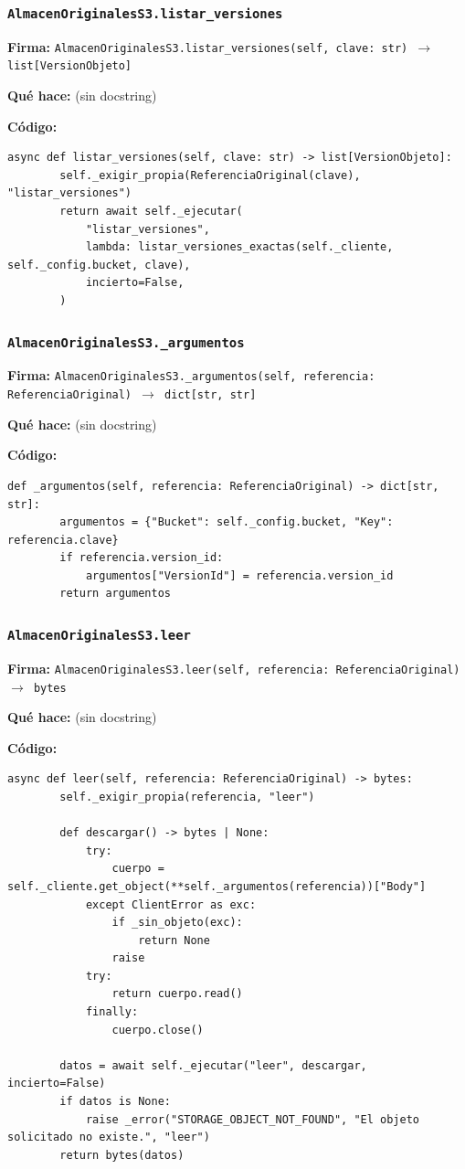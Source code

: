 \documentclass[11pt,a4paper]{article}
\begin{document}
\subsubsection*{\texttt{AlmacenOriginalesS3.listar\_versiones}}
\textbf{Firma:} \texttt{AlmacenOriginalesS3.listar\_versiones(self, clave: str) $\rightarrow$ list[VersionObjeto]}

\textbf{Qué hace:} (sin docstring)

\textbf{Código:}
\begin{lstlisting}
async def listar_versiones(self, clave: str) -> list[VersionObjeto]:
        self._exigir_propia(ReferenciaOriginal(clave), "listar_versiones")
        return await self._ejecutar(
            "listar_versiones",
            lambda: listar_versiones_exactas(self._cliente, self._config.bucket, clave),
            incierto=False,
        )
\end{lstlisting}

\subsubsection*{\texttt{AlmacenOriginalesS3.\_argumentos}}
\textbf{Firma:} \texttt{AlmacenOriginalesS3.\_argumentos(self, referencia: ReferenciaOriginal) $\rightarrow$ dict[str, str]}

\textbf{Qué hace:} (sin docstring)

\textbf{Código:}
\begin{lstlisting}
def _argumentos(self, referencia: ReferenciaOriginal) -> dict[str, str]:
        argumentos = {"Bucket": self._config.bucket, "Key": referencia.clave}
        if referencia.version_id:
            argumentos["VersionId"] = referencia.version_id
        return argumentos
\end{lstlisting}

\subsubsection*{\texttt{AlmacenOriginalesS3.leer}}
\textbf{Firma:} \texttt{AlmacenOriginalesS3.leer(self, referencia: ReferenciaOriginal) $\rightarrow$ bytes}

\textbf{Qué hace:} (sin docstring)

\textbf{Código:}
\begin{lstlisting}
async def leer(self, referencia: ReferenciaOriginal) -> bytes:
        self._exigir_propia(referencia, "leer")

        def descargar() -> bytes | None:
            try:
                cuerpo = self._cliente.get_object(**self._argumentos(referencia))["Body"]
            except ClientError as exc:
                if _sin_objeto(exc):
                    return None
                raise
            try:
                return cuerpo.read()
            finally:
                cuerpo.close()

        datos = await self._ejecutar("leer", descargar, incierto=False)
        if datos is None:
            raise _error("STORAGE_OBJECT_NOT_FOUND", "El objeto solicitado no existe.", "leer")
        return bytes(datos)
\end{lstlisting}
\end{document}
